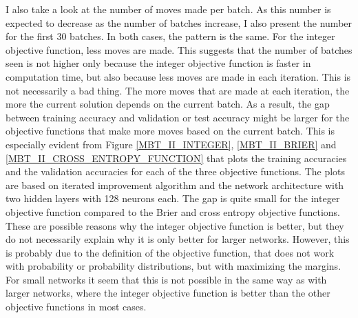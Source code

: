 \noindent I also take a look at the number of moves made per batch. As this number is expected to decrease as the number of batches increase, I also present the number for the first 30 batches. In both cases, the pattern is the same. For the integer objective function, less moves are made. This suggests that the number of batches seen is not higher only because the integer objective function is faster in computation time, but also because less moves are made in each iteration. This is not necessarily a bad thing. The more moves that are made at each iteration, the more the current solution depends on the current batch. As a result, the gap between training accuracy and validation or test accuracy might be larger for the objective functions that make more moves based on the current batch. This is especially evident from Figure \ref{MBT_II_INTEGER}, \ref{MBT_II_BRIER} and \ref{MBT_II_CROSS_ENTROPY_FUNCTION} that plots the training accuracies and the validation accuracies for each of the three objective functions. The plots are based on iterated improvement algorithm and the network architecture with two hidden layers with 128 neurons each. The gap is quite small for the integer objective function compared to the Brier and cross entropy objective functions. \\

\noindent These are possible reasons why the integer objective function is better, but they do not necessarily explain why it is only better for larger networks. However, this is probably due to the definition of the objective function, that does not work with probability or probability distributions, but with maximizing the margins. For small networks it seem that this is not possible in the same way as with larger networks, where the integer objective function is better than the other objective functions in most cases. 






